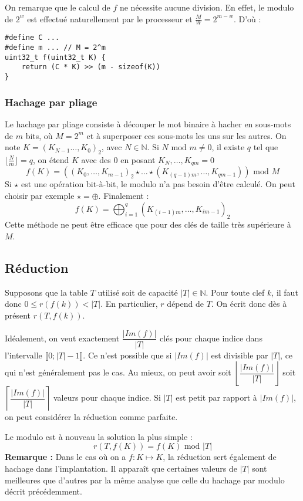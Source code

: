 \documentclass[../../../main.tex]{subfiles}
\begin{document}
On remarque que le calcul de $f$ ne nécessite aucune division. En effet, le modulo de $2^w$ est effectué naturellement par le processeur et $\frac{M}{W} = 2^{m-w}$. D'où :
\begin{verbatim}
#define C ...
#define m ... // M = 2^m
uint32_t f(uint32_t K) {
	return (C * K) >> (m - sizeof(K))
}
\end{verbatim}
\subsubsection{Hachage par pliage}
Le hachage par pliage consiste à découper le mot binaire à hacher en sous-mots de $m$ bits, où $M = 2^m$ et à superposer ces sous-mots les uns sur les autres. On note $K = (K_{N-1} \dots, K_0)_2$, avec $N\in\mathbb{N}$. Si $N\text{ mod }m \neq 0$, il existe $q$ tel que $\lfloor\frac{N}{m}\rfloor = q$, on étend $K$ avec des $0$ en posant $K_N, \dots, K_{qm} = 0$
$$f(K) = \left((K_0, \dots, K_{m-1})_2\star \dots \star (K_{(q-1)m}, \dots, K_{qm - 1})\right)\text{ mod }M$$
Si $\star$ est une opération bit-à-bit, le modulo n'a pas besoin d'être calculé. On peut choisir par exemple $\star = \oplus$. Finalement :
$$f(K) = \displaystyle\bigoplus_{i = 1}^{q}(K_{(i - 1)m}, \dots, K_{im - 1})_2$$
Cette méthode ne peut être efficace que pour des clés de taille très supérieure à $M$.
\subsection{Réduction}
Supposons que la table $T$ utilisé soit de capacité $|T|\in\mathbb{N}$. Pour toute clef $k$, il faut donc $0\leq r(f(k)) < |T|$. En particulier, $r$ dépend de $T$. On écrit donc dès à présent $r(T, f(k))$.

Idéalement, on veut exactement $\dfrac{|Im(f)|}{|T|}$ clés pour chaque indice dans l'intervalle $\llbracket 0; |T| - 1\rrbracket$. Ce n'est possible que si $|Im(f)|$ est divisible par $|T|$, ce qui n'est généralement pas le cas. Au mieux, on peut avoir soit $\left\lfloor \dfrac{|Im(f)|}{|T|}\right\rfloor$ soit $\left\lceil \dfrac{|Im(f)|}{|T|}\right\rceil$ valeurs pour chaque indice. Si $|T|$ est petit par rapport à $|Im(f)|$, on peut considérer la réduction comme parfaite.

Le modulo est à nouveau la solution la plus simple :
$$r(T, f(K)) = f(K)\text{ mod }|T|$$
\textbf{Remarque :} Dans le cas où on a $f : K\mapsto K$, la réduction sert également de hachage dans l'implantation. Il apparaît que certaines valeurs de $|T|$ sont meilleures que d'autres par la même analyse que celle du hachage par modulo décrit précédemment. %
\end{document}
